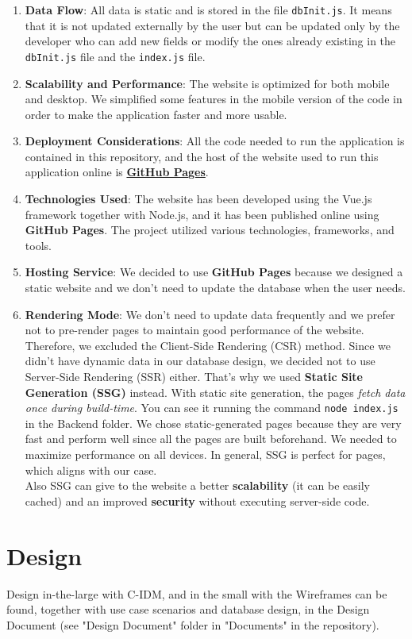 \documentclass[12pt]{article}
\begin{document}
\begin{enumerate}
\item \textbf{Data Flow}: All data is static and is stored in the file \texttt{dbInit.js}. It means that it is not updated externally by the user but can be updated only by the developer who can add new fields or modify the ones already existing in the \texttt{dbInit.js} file and the \texttt{index.js} file.
\item \textbf{Scalability and Performance}: The website is optimized for both mobile and desktop. We simplified some features in the mobile version of the code in order to make the application faster and more usable.
\item \textbf{Deployment Considerations}: All the code needed to run the application is contained in this repository, and the host of the website used to run this application online is \href{https://pages.github.com/}{\textbf{GitHub Pages}}.
\item \textbf{Technologies Used}: The website has been developed using the Vue.js framework together with Node.js, and it has been published online using \textbf{GitHub Pages}. The project utilized various technologies, frameworks, and tools.
\item \textbf{Hosting Service}: We decided to use \textbf{GitHub Pages} because we designed a static website and we don't need to update the database when the user needs.
\item \textbf{Rendering Mode}: We don't need to update data frequently and we prefer not to pre-render pages to maintain good performance of the website. Therefore, we excluded the Client-Side Rendering (CSR) method. Since we didn't have dynamic data in our database design, we decided not to use Server-Side Rendering (SSR) either. That's why we used \textbf{Static Site Generation (SSG)} instead. With static site generation, the pages \textit{fetch data once during build-time}. You can see it running the command \texttt{node index.js} in the Backend folder. We chose static-generated pages because they are very fast and perform well since all the pages are built beforehand. We needed to maximize performance on all devices. In general, SSG is perfect for pages, which aligns with our case.\\
Also SSG can give to the website a better \textbf{scalability} (it can be easily cached) and an improved \textbf{security} without executing server-side code.

\end{enumerate}

\section{Design}
Design in-the-large with C-IDM, and in the small with the Wireframes can be found, together with use case scenarios and database design, in the Design Document (see "Design Document" folder in "Documents" in the repository).
\end{document}
